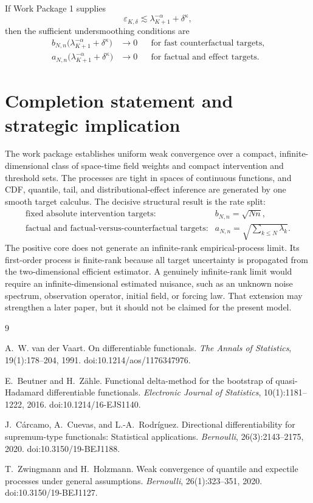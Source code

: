 \documentclass[11pt]{article}
\theoremstyle{remark}
\newcommand{\an}{a_{N,n}}
\newcommand{\bn}{b_{N,n}}
\begin{document}
If Work Package 1 supplies
\[
 \varepsilon_{K,\delta}
 \lesssim \lambda_{K+1}^{-\alpha}+\delta^\kappa,
\]
then the sufficient undersmoothing conditions are
\begin{align*}
 \bn\big(\lambda_{K+1}^{-\alpha}+\delta^\kappa\big)&\to0
 &&\text{for fast counterfactual targets},\\
 \an\big(\lambda_{K+1}^{-\alpha}+\delta^\kappa\big)&\to0
 &&\text{for factual and effect targets}.
\end{align*}

\section{Completion statement and strategic implication}

The work package establishes uniform weak convergence over a compact, infinite-dimensional class of space-time field weights and compact intervention and threshold sets.  The processes are tight in spaces of continuous functions, and CDF, quantile, tail, and distributional-effect inference are generated by one smooth target calculus.  The decisive structural result is the rate split:
\[
 \boxed{
 \begin{array}{ll}
 \text{fixed absolute intervention targets:}&\bn=\sqrt{Nn},\\[1mm]
 \text{factual and factual-versus-counterfactual targets:}&\an=\sqrt{\sum_{k\le N}\lambda_k}.
 \end{array}}
\]
The positive core does not generate an infinite-rank empirical-process limit.  Its first-order process is finite-rank because all target uncertainty is propagated from the two-dimensional efficient estimator.  A genuinely infinite-rank limit would require an infinite-dimensional estimated nuisance, such as an unknown noise spectrum, observation operator, initial field, or forcing law.  That extension may strengthen a later paper, but it should not be claimed for the present model.

\begin{thebibliography}{9}

A.~W. van der Vaart.
\newblock On differentiable functionals.
\newblock \emph{The Annals of Statistics}, 19(1):178--204, 1991.
\newblock doi:10.1214/aos/1176347976.

E.~Beutner and H.~Z\"ahle.
\newblock Functional delta-method for the bootstrap of quasi-Hadamard differentiable functionals.
\newblock \emph{Electronic Journal of Statistics}, 10(1):1181--1222, 2016.
\newblock doi:10.1214/16-EJS1140.

J.~C\'arcamo, A.~Cuevas, and L.-A.~Rodr\'iguez.
\newblock Directional differentiability for supremum-type functionals: Statistical applications.
\newblock \emph{Bernoulli}, 26(3):2143--2175, 2020.
\newblock doi:10.3150/19-BEJ1188.

T.~Zwingmann and H.~Holzmann.
\newblock Weak convergence of quantile and expectile processes under general assumptions.
\newblock \emph{Bernoulli}, 26(1):323--351, 2020.
\newblock doi:10.3150/19-BEJ1127.

\end{thebibliography}
\end{document}

